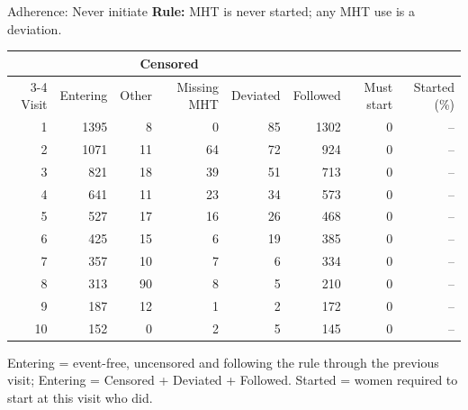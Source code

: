 \begin{frame}{Adherence: Never initiate}
\centering
{\small \textbf{Rule:} MHT is never started; any MHT use is a deviation.}\par\vspace{6pt}
{\scriptsize
\begin{tabular}{r r r r r r r r}
\toprule
 & & \multicolumn{2}{c}{Censored} & & & & \\
\cmidrule(lr){3-4}
Visit & Entering & Other & Missing MHT & Deviated & Followed & Must start & Started (\%) \\
\midrule
1 & 1395 & 8 & 0 & 85 & 1302 & 0 & -- \\
2 & 1071 & 11 & 64 & 72 & 924 & 0 & -- \\
3 & 821 & 18 & 39 & 51 & 713 & 0 & -- \\
4 & 641 & 11 & 23 & 34 & 573 & 0 & -- \\
5 & 527 & 17 & 16 & 26 & 468 & 0 & -- \\
6 & 425 & 15 & 6 & 19 & 385 & 0 & -- \\
7 & 357 & 10 & 7 & 6 & 334 & 0 & -- \\
8 & 313 & 90 & 8 & 5 & 210 & 0 & -- \\
9 & 187 & 12 & 1 & 2 & 172 & 0 & -- \\
10 & 152 & 0 & 2 & 5 & 145 & 0 & -- \\
\bottomrule
\end{tabular}}
\par\vspace{6pt}
{\tiny Entering = event-free, uncensored and following the rule through the previous visit; Entering = Censored + Deviated + Followed. Started = women required to start at this visit who did.}
\end{frame}

